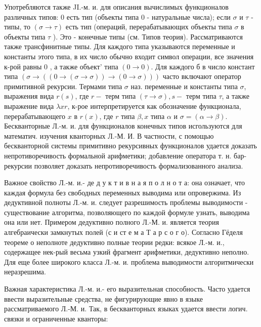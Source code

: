 \documentclass[10pt]{article}
\begin{document}
Употребляются также JI.-м. и. для описания вычислимых функционалов различных типов: 0 есть тип (объекты типа 0 - натуральные числа); если $\sigma$ и $\tau$ - типы, то $(\sigma \rightarrow \tau)$ есть тип (операций, перерабатывающих объекты типа $\sigma$ в объекты типа $\tau$ ). Это - конечные типы (см. Типов теория). Рассматриваются также трансфинитные типы. Для каждого типа указываются переменные и константы этого типа, в их число обычно входит символ операции, все значения к-рой равны 0 , а также объект' типа $(0 \rightarrow 0)$. Для каждого б в число констант типа $(\sigma \longrightarrow((0 \longrightarrow(\sigma \longrightarrow \sigma)) \longrightarrow(0 \longrightarrow \sigma)))$ часто включают оператор примитивной рекурсии. Термами типа $\sigma$ наз. переменные и константы типа $\sigma$, выражения вида $r(s)$, где $r-$ терм типа $(\tau \rightarrow \sigma), s-$ терм типа $\tau$, а также выражение вида $\lambda x r$, к-рое интерпретируется как обозначение функционала, перерабатывающего $x$ в $r(x)$, где $r$ типа $\beta, x$ типа $\alpha$ и $\sigma=(\alpha \rightarrow \beta)$. Бескванторные Л.-м. и. для функционалов конечных типов исгользуются для математич. изучения кванторных Л.-М. И. В частности, с помощью бескванторной системы примитивно рекурсивных функционалов удается доказать непротиворечивость формальной арифметики; добавление оператора т. н. бар-рекурсии позволяет доказать непротиворечивость формализованного анализа.



Важное свойство Л.-м. и.- де д у к т и в н а я п о л н о т а: она означает, что каждая формула без свободных переменных выводима или опровержима. Из дедуктивной полноты Л.-м. и. следует разрешимость проблемы выводимости - существование алгоритма, позволяющего по каждой формуле узнать, выводима она или нет. Примером дедуктивно полного Л.-М. и. является теория алгебраически замкнутых полей (с и ст е м а Т а р с о г о). Согласно Гёделя теореме о неполноте дедуктивно полные теории редки: всякое Л.-м. и., содержащее нек-рый весьма узкий фрагмент арифметики, дедуктивно неполно. Для еще более широкого класса Л.-м. и. проблема выводимости алгоритмически неразрешима.



Важная характеристика Л.-м. и.- его выразительная способность. Часто удается ввести выразительные средства, не фигурирующие явно в языке рассматриваемого Л.-М. и. Так, в бескванторных языках удается ввести логич. связки и ограниченные кванторы:
\end{document}
